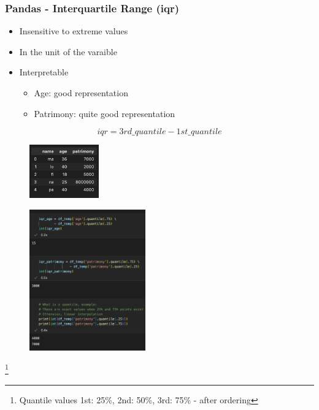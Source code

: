 \begin{frame}\frametitle{Pandas - Interquartile Range (iqr)}
   \begin{minipage}{0.58\linewidth}
      \begin{itemize}
         \item Insensitive to extreme values
         \item In the unit of the varaible
         \item Interpretable
         \begin{itemize}
            \item Age: good representation
            \item Patrimony: quite good representation
         \end{itemize}
      \end{itemize}
      \vspace{.5cm}
      $$iqr = 3rd\_quantile - 1st\_quantile$$
      \begin{figure}[H]
         \includegraphics[width=3cm]{../images/illustrations/data_analysis_df_2.png}
      \end{figure}
   \end{minipage}
   \begin{minipage}{0.38\linewidth}
      \begin{figure}[H]
         \includegraphics[width=5cm]{../images/illustrations/iqr.png}
      \end{figure}
   \end{minipage}
   \footnote{Quantile values 1st: 25\%, 2nd: 50\%, 3rd: 75\% - after ordering}
\end{frame}



